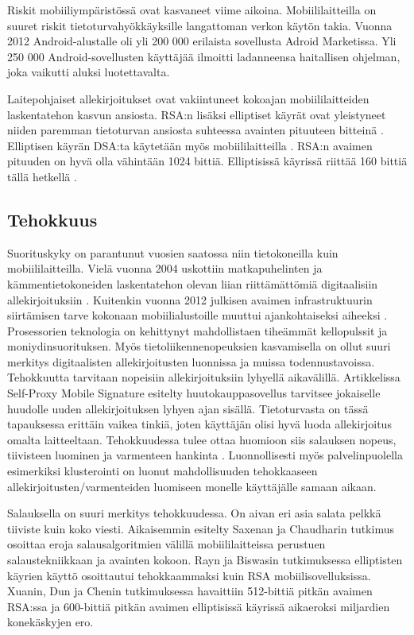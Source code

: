 \documentclass[finnish]{tktltiki2}
\theoremstyle{definition}
\theoremstyle{remark}
\begin{document}
Riskit mobiiliympäristössä ovat kasvaneet viime aikoina. Mobiililaitteilla on suuret riskit tietoturvahyökkäyksille langattoman verkon käytön takia. Vuonna 2012 Android-alustalle oli yli 200 000 erilaista sovellusta Adroid Marketissa. Yli 250 000 Android-sovellusten käyttäjää ilmoitti ladanneensa haitallisen ohjelman, joka vaikutti aluksi luotettavalta. \cite{enti}

Laitepohjaiset allekirjoitukset ovat vakiintuneet kokoajan mobiililaitteiden laskentatehon kasvun ansiosta. RSA:n lisäksi elliptiset käyrät ovat yleistyneet niiden paremman tietoturvan ansiosta suhteessa avainten pituuteen bitteinä \cite{ECC}. Elliptisen käyrän DSA:ta käytetään myös mobiililaitteilla \cite{webs}. RSA:n avaimen pituuden on hyvä olla vähintään 1024 bittiä. Elliptisissä käyrissä riittää 160 bittiä tällä hetkellä \cite{ECC}.   
	  

\subsection{Tehokkuus}

Suorituskyky on parantunut vuosien saatossa niin tietokoneilla kuin mobiililaitteilla. Vielä vuonna 2004 uskottiin matkapuhelinten ja kämmentietokoneiden laskentatehon olevan liian riittämättömiä digitaalisiin allekirjoituksiin \cite{gene}. Kuitenkin vuonna 2012 julkisen avaimen infrastruktuurin siirtämisen tarve kokonaan mobiilialustoille muuttui ajankohtaiseksi aiheeksi \cite{ECC}. Prosessorien teknologia on kehittynyt mahdollistaen tiheämmät kellopulssit ja moniydinsuorituksen. Myös tietoliikennenopeuksien kasvamisella on ollut suuri merkitys digitaalisten allekirjoitusten luonnissa ja muissa todennustavoissa. Tehokkuutta tarvitaan nopeisiin allekirjoituksiin lyhyellä aikavälillä. Artikkelissa Self-Proxy Mobile Signature \cite{proxy} esitelty huutokauppasovellus tarvitsee jokaiselle huudolle uuden  allekirjoituksen lyhyen ajan sisällä. Tietoturvasta on tässä tapauksessa erittäin vaikea tinkiä, joten käyttäjän olisi hyvä luoda allekirjoitus omalta laitteeltaan. Tehokkuudessa tulee ottaa huomioon siis salauksen nopeus, tiivisteen luominen ja varmenteen hankinta \cite{proxy}. Luonnollisesti myös palvelinpuolella esimerkiksi klusterointi on luonut mahdollisuuden tehokkaaseen allekirjoitusten/varmenteiden luomiseen monelle käyttäjälle samaan aikaan.

Salauksella on suuri merkitys tehokkuudessa. On aivan eri asia salata pelkkä tiiviste kuin koko viesti. Aikaisemmin esitelty Saxenan ja Chaudharin \cite{gsm} tutkimus osoittaa eroja salausalgoritmien välillä mobiililaitteissa perustuen salaustekniikkaan ja avainten kokoon. Rayn ja Biswasin \cite{ECC} tutkimuksessa elliptisten käyrien käyttö osoittautui tehokkaammaksi kuin RSA mobiilisovelluksissa. Xuanin, Dun ja Chenin \cite{webs} tutkimuksessa havaittiin 512-bittiä pitkän avaimen RSA:ssa ja 600-bittiä pitkän avaimen elliptisissä käyrissä aikaeroksi miljardien konekäskyjen ero.
\end{document}
